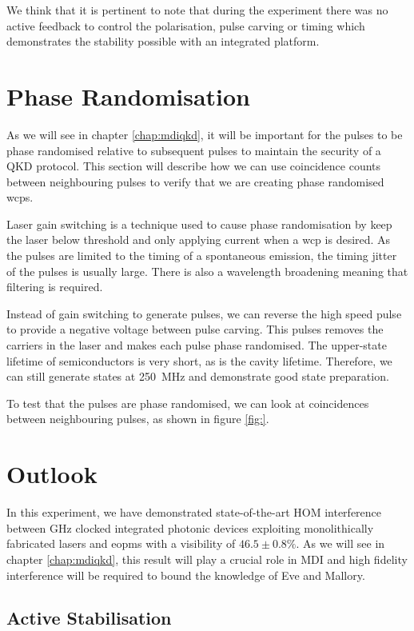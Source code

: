 {We think that it is pertinent to note that during the experiment there was no active feedback to control the polarisation, pulse carving or timing which demonstrates the stability possible with an integrated platform. 

\section{Phase Randomisation}

As we will see in chapter \ref{chap:mdiqkd}, it will be important for the pulses to be phase randomised relative to subsequent pulses to maintain the security of a \ac{QKD} protocol. This section will describe how we can use coincidence counts between neighbouring pulses to verify that we are creating phase randomised \acp{wcp}.

Laser gain switching is a technique used to cause phase randomisation by keep the laser below threshold and only applying current when a \ac{wcp} is desired. As the pulses are limited to the timing of a spontaneous emission, the timing jitter of the pulses is usually large. There is also a wavelength broadening meaning that filtering is required. 

Instead of gain switching to generate pulses, we can reverse the high speed pulse to provide a negative voltage between pulse carving. This pulses removes the carriers in the laser and makes each pulse phase randomised. The upper-state lifetime of semiconductors is very short, as is the cavity lifetime. Therefore, we can still generate states at \SI{250}{MHz} and demonstrate good state preparation.

To test that the pulses are phase randomised, we can look at coincidences between neighbouring pulses, as shown in figure \ref{fig:}.  

\section{Outlook}

In this experiment, we have demonstrated state-of-the-art \acl{HOM} interference between GHz clocked integrated photonic devices exploiting monolithically fabricated lasers and \acp{eopm} with a visibility of $46.5\pm 0.8\%$. As we will see in chapter \ref{chap:mdiqkd}, this result will play a crucial role in \ac{MDI} and high fidelity interference will be required to bound the knowledge of Eve and Mallory.

\subsection{Active Stabilisation}

}
